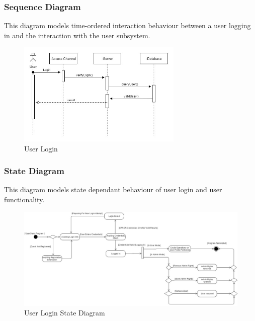 \subsubsection{Sequence Diagram}
This diagram models time-ordered interaction behaviour between a user logging in and the interaction with the user subsystem.
\begin{figure}[H]
		\centering
		\includegraphics[width=0.7\textwidth]{user/img/UserSequence.jpg}
		\caption{User Login}
\end{figure}



\subsubsection{State Diagram}
This diagram models state dependant behaviour of user login and user functionality.
\begin{figure}[H]
		\centering
		\includegraphics[width=\textwidth]{user/img/UserStateDiagram.jpg}
		\caption{User Login State Diagram}
\end{figure}




